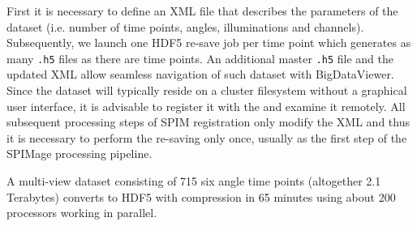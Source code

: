 \documentclass{scrartcl}
\begin{document}
First it is necessary to define an XML file that describes the parameters of the dataset (i.e. number of time points, angles, illuminations and channels).
Subsequently, we launch one HDF5 re-save job per time point which generates as many \texttt{.h5} files as there are time points.
An additional master \texttt{.h5} file and the updated XML allow seamless navigation of such dataset with BigDataViewer.
Since the dataset will typically reside on a cluster filesystem without a graphical user interface, it is advisable to register it with the
\href{http://fiji.sc/BigDataServer}{} and examine it remotely.
All subsequent processing steps of SPIM registration only modify the XML and thus it is necessary to perform the re-saving only once, usually as the first step of the SPIMage processing pipeline.

A multi-view dataset consisting of 715 six angle time points (altogether 2.1 Terabytes) converts to HDF5 with compression in 65 minutes using about 200 processors working in parallel.

\newpage



\end{document}

